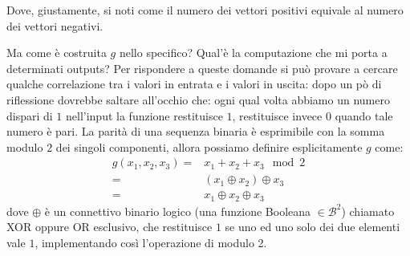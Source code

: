 \documentclass[12pt,a4paper,openright]{report}
\newcommand*\xor{\mathbin{\oplus}}
\begin{document}
\begin{center}
\end{center}
Dove, giustamente, si noti come il numero dei vettori positivi equivale al numero dei vettori negativi.\par
Ma come è costruita $g$ nello specifico? Qual'è la computazione che mi porta a determinati outputs?
Per rispondere a queste domande si può provare a cercare qualche correlazione tra i valori in entrata e i valori in uscita:
dopo un pò di riflessione dovrebbe saltare all'occhio che: ogni qual volta abbiamo un numero dispari di $1$ nell'input la funzione 
restituisce $1$, restituisce invece $0$ quando tale numero è pari.
La parità di una sequenza binaria è esprimibile con la somma modulo $2$ dei singoli componenti, allora possiamo definire esplicitamente $g$ come:
\begin{align*}
    g(x_1, x_2, x_3)= &x_1 + x_2 + x_3 \mod 2  \\
                    = &(x_1 \xor x_2) \xor x_3  \\
                    = &x_1 \xor x_2 \xor x_3
\end{align*}
dove $\xor$ è un connettivo binario logico (una funzione Booleana $\in \mathcal{B}^2$) chiamato XOR oppure OR esclusivo, che restituisce $1$ se uno ed uno solo dei due 
elementi vale $1$, implementando così l'operazione di modulo 2. 
\end{document}
